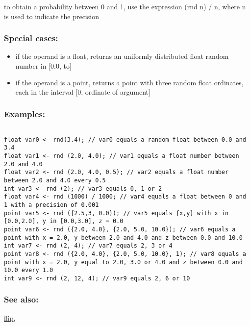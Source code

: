 \documentclass[]{book}
\providecommand{\tightlist}{%
  \setlength{\itemsep}{0pt}\setlength{\parskip}{0pt}}
\theoremstyle{definition}
\theoremstyle{definition}
\theoremstyle{definition}
\theoremstyle{remark}
\begin{document}
to obtain a probability between 0 and 1, use the expression (rnd n) / n,
where n is used to indicate the precision

\subsubsection{Special cases:}\label{special-cases-119}

\begin{itemize}
\tightlist
\item
  if the operand is a float, returns an uniformly distributed float
  random number in {[}0.0, to{]}\\
\item
  if the operand is a point, returns a point with three random float
  ordinates, each in the interval {[}0, ordinate of argument{]}
\end{itemize}

\subsubsection{Examples:}\label{examples-302}

\begin{verbatim}
 
float var0 <- rnd(3.4); // var0 equals a random float between 0.0 and 3.4 
float var1 <- rnd (2.0, 4.0); // var1 equals a float number between 2.0 and 4.0 
float var2 <- rnd (2.0, 4.0, 0.5); // var2 equals a float number between 2.0 and 4.0 every 0.5 
int var3 <- rnd (2); // var3 equals 0, 1 or 2 
float var4 <- rnd (1000) / 1000; // var4 equals a float between 0 and 1 with a precision of 0.001 
point var5 <- rnd ({2.5,3, 0.0}); // var5 equals {x,y} with x in [0.0,2.0], y in [0.0,3.0], z = 0.0 
point var6 <- rnd ({2.0, 4.0}, {2.0, 5.0, 10.0}); // var6 equals a point with x = 2.0, y between 2.0 and 4.0 and z between 0.0 and 10.0 
int var7 <- rnd (2, 4); // var7 equals 2, 3 or 4 
point var8 <- rnd ({2.0, 4.0}, {2.0, 5.0, 10.0}, 1); // var8 equals a point with x = 2.0, y equal to 2.0, 3.0 or 4.0 and z between 0.0 and 10.0 every 1.0 
int var9 <- rnd (2, 12, 4); // var9 equals 2, 6 or 10
\end{verbatim}

\subsubsection{See also:}\label{see-also-176}

\href{OperatorsDH\#flip}{flip},
\end{document}
